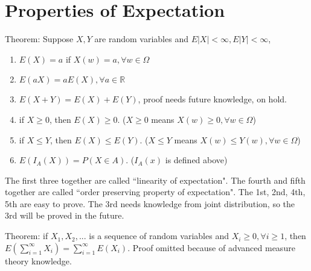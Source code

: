 \documentclass[12pt]{article}
\begin{document}
\section{Properties of Expectation}

Theorem: Suppose $X,Y$ are random variables and $E|X|<\infty,E|Y|<\infty$,
\begin{enumerate}
    \item $E(X)=a$ if $X(w)=a, \forall w\in\Omega$
    \item $E(aX)=aE(X), \forall a\in\mathbb{R}$
    \item $E(X+Y)=E(X)+E(Y)$, proof needs future knowledge, on hold.
    \item if $X\ge 0$, then $E(X)\ge 0$. ($X\ge 0$ means $X(w)\ge 0,\forall w\in\Omega$)
    \item if $X\le Y$, then $E(X)\le E(Y)$. ($X\le Y$ means $X(w)\le Y(w),\forall w\in\Omega$)
    \item $E(I_A(X))=P(X\in A)$. ($I_A(x)$ is defined above)
\end{enumerate}
The first three together are called ``linearity of expectation".
The fourth and fifth together are called ``order preserving property of expectation".
The 1st, 2nd, 4th, 5th are easy to prove. The 3rd needs knowledge from joint
distribution, so the 3rd will be proved in the future.

\bigbreak
Theorem: if $X_1,X_2,...$ is a sequence of random variables and $X_i\ge 0,\forall i\ge 1$,
then $E(\sum\limits_{i=1}^{\infty}X_i)=\sum\limits_{i=1}^{\infty}E(X_i)$. Proof omitted because
of advanced measure theory knowledge.
\end{document}
